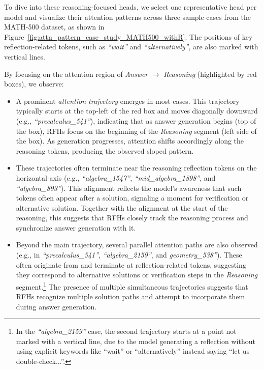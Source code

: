 \documentclass[11pt]{article}
\begin{document}
To dive into these reasoning-focused heads, we select one representative head per model and visualize their attention patterns across three sample cases from the MATH-500 dataset, as shown in Figure~\ref{fig:attn_pattern_case_study_MATH500_withR}. 
The positions of key reflection-related tokens, such as \textit{“wait”} and \textit{“alternatively”}, are also marked with vertical lines.

By focusing on the attention region of \textit{Answer} $\rightarrow$ \textit{Reasoning} (highlighted by red boxes), we observe:

\begin{itemize}[leftmargin=5pt]

\item A prominent \textit{attention trajectory} emerges in most cases. This trajectory typically starts at the top-left of the red box and moves diagonally downward (e.g., \textit{``precalculus\_541''}), indicating that as answer generation begins (top of the box), RFHs focus on the beginning of the \textit{Reasoning} segment (left side of the box). As generation progresses, attention shifts accordingly along the reasoning tokens, producing the observed sloped pattern.

\item These trajectories often terminate near the reasoning reflection tokens on the horizontal axis (e.g., \textit{``algebra\_1547''}, \textit{``mid\_algebra\_1898''}, and \textit{``algebra\_893''}). This alignment reflects the model's awareness that such tokens often appear after a solution, signaling a moment for verification or alternative solution. Together with the alignment at the start of the reasoning, this suggests that RFHs closely track the reasoning process and synchronize answer generation with it.

\item Beyond the main trajectory, several parallel attention paths are also observed (e.g., in \textit{``precalculus\_541''}, \textit{``algebra\_2159''}, and \textit{geometry\_538''}). These often originate from and terminate at reflection-related tokens, suggesting they correspond to alternative solutions or verification steps in the \textit{Reasoning} segment.\footnote{In the \textit{``algebra\_2159''} case, the second trajectory starts at a point not marked with a vertical line, due to the model generating a reflection without using explicit keywords like ``wait'' or ``alternatively'' instead saying ``let us double-check...''.} The presence of multiple simultaneous trajectories suggests that RFHs recognize multiple solution paths and attempt to incorporate them during answer generation.


\end{itemize}
\end{document}
